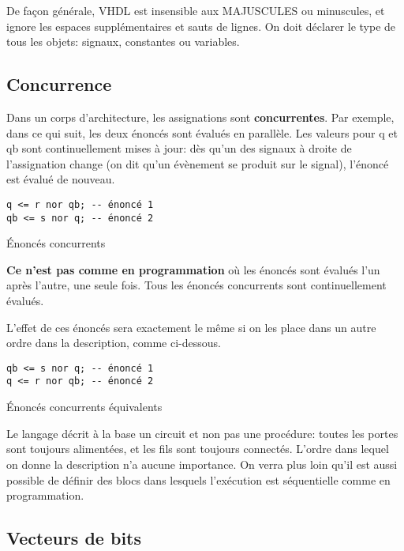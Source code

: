 \documentclass[11pt]{article}
\begin{document}
De façon générale, VHDL est insensible aux MAJUSCULES ou minuscules,
et ignore les espaces supplémentaires et sauts de lignes. On doit
déclarer le type de tous les objets: signaux, constantes ou variables.

\subsection{Concurrence}
\label{sec:org83d9b17}

Dans un corps d'architecture, les assignations sont
\textbf{concurrentes}. Par exemple, dans ce qui suit, les deux énoncés sont
évalués en parallèle. Les valeurs pour q et qb sont continuellement
mises à jour: dès qu'un des signaux à droite de l'assignation change
(on dit qu'un évènement se produit sur le signal), l'énoncé est évalué
de nouveau.

\begin{listing}[htbp]
\begin{verbatim}
q <= r nor qb; -- énoncé 1
qb <= s nor q; -- énoncé 2
\end{verbatim}
\caption{Énoncés concurrents}
\end{listing}

\textbf{Ce n'est pas comme en programmation} où les énoncés sont évalués
l'un après l'autre, une seule fois. Tous les énoncés concurrents sont
continuellement évalués.

L'effet de ces énoncés sera exactement le même si on les place dans un
autre ordre dans la description, comme ci-dessous.

\begin{listing}[htbp]
\begin{verbatim}
qb <= s nor q; -- énoncé 1
q <= r nor qb; -- énoncé 2
\end{verbatim}
\caption{Énoncés concurrents équivalents}
\end{listing}

Le langage décrit à la base un circuit et non pas une procédure:
toutes les portes sont toujours alimentées, et les fils sont toujours
connectés. L'ordre dans lequel on donne la description n'a aucune
importance. On verra plus loin qu'il est aussi possible de définir des blocs
dans lesquels l'exécution est séquentielle comme en programmation.

\subsection{Vecteurs de bits}
\label{sec:org2e61373}
\end{document}
